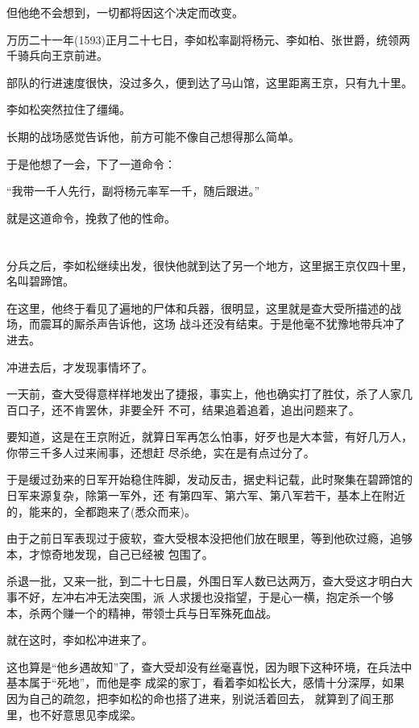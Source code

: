 \documentclass[11pt,a4paper,onecolumn]{article}
\begin{document}
但他绝不会想到，一切都将因这个决定而改变。

万历二十一年(1593)正月二十七日，李如松率副将杨元、李如柏、张世爵，统领两千骑兵向王京前进。

部队的行进速度很快，没过多久，便到达了马山馆，这里距离王京，只有九十里。

李如松突然拉住了缰绳。

长期的战场感觉告诉他，前方可能不像自己想得那么简单。

于是他想了一会，下了一道命令：

``我带一千人先行，副将杨元率军一千，随后跟进。''

就是这道命令，挽救了他的性命。

\section[\thesection]{}

分兵之后，李如松继续出发，很快他就到达了另一个地方，这里据王京仅四十里，名叫碧蹄馆。

在这里，他终于看见了遍地的尸体和兵器，很明显，这里就是查大受所描述的战场，而震耳的厮杀声告诉他，这场
战斗还没有结束。于是他毫不犹豫地带兵冲了进去。

冲进去后，才发现事情坏了。

一天前，查大受得意样样地发出了捷报，事实上，他也确实打了胜仗，杀了人家几百口子，还不肯罢休，非要全歼
不可，结果追着追着，追出问题来了。

要知道，这是在王京附近，就算日军再怎么怕事，好歹也是大本营，有好几万人，你带三千多人过来闹事，还想赶
尽杀绝，实在是有点过分了。

于是缓过劲来的日军开始稳住阵脚，发动反击，据史料记载，此时聚集在碧蹄馆的日军来源复杂，除第一军外，还
有第四军、第六军、第八军若干，基本上在附近的，能来的，全都跑来了(悉众而来)。

由于之前日军表现过于疲软，查大受根本没把他们放在眼里，等到他砍过瘾，追够本，才惊奇地发现，自己已经被
包围了。

杀退一批，又来一批，到二十七日晨，外围日军人数已达两万，查大受这才明白大事不好，左冲右冲无法突围，派
人求援也没指望，于是心一横，抱定杀一个够本，杀两个赚一个的精神，带领士兵与日军殊死血战。

就在这时，李如松冲进来了。

这也算是``他乡遇故知''了，查大受却没有丝毫喜悦，因为眼下这种环境，在兵法中基本属于``死地''，而他是李
成梁的家丁，看着李如松长大，感情十分深厚，如果因为自己的疏忽，把李如松的命也搭了进来，别说活着回去，
就算到了阎王那里，也不好意思见李成梁。
\end{document}
